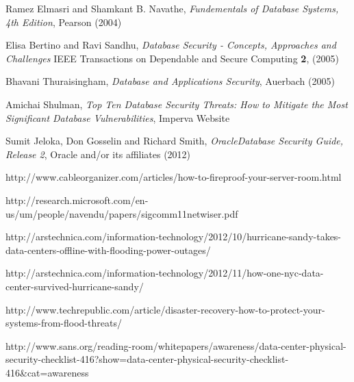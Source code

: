 \documentclass[11pt, twocolumn]{article}
\begin{document}
\balance
\begin{thebibliography}{}

  Ramez Elmasri and Shamkant B. Navathe, {\it Fundementals of Database Systems, 4th Edition}, Pearson (2004)

  Elisa Bertino and Ravi Sandhu, {\it Database Security - Concepts, Approaches and Challenges} IEEE Transactions on Dependable and Secure Computing {\bf 2},  (2005)

  Bhavani Thuraisingham, {\it Database and Applications Security}, Auerbach (2005)

  Amichai Shulman, {\it Top Ten Database Security Threats: How to Mitigate the Most Significant Database Vulnerabilities}, Imperva Website

  Sumit Jeloka, Don Gosselin and Richard Smith, {\it Oracle\textregistered Database Security Guide, Release 2}, Oracle and/or its affiliates (2012)

  http://www.cableorganizer.com/articles/how-to-fireproof-your-server-room.html

  http://research.microsoft.com/en-us/um/people/navendu/papers/sigcomm11netwiser.pdf


  http://arstechnica.com/information-technology/2012/10/hurricane-sandy-takes-data-centers-offline-with-flooding-power-outages/

  http://arstechnica.com/information-technology/2012/11/how-one-nyc-data-center-survived-hurricane-sandy/

  http://www.techrepublic.com/article/disaster-recovery-how-to-protect-your-systems-from-flood-threats/

  http://www.sans.org/reading-room/whitepapers/awareness/data-center-physical-security-checklist-416?show=data-center-physical-security-checklist-416\&cat=awareness


\end{thebibliography}
\end{document}
